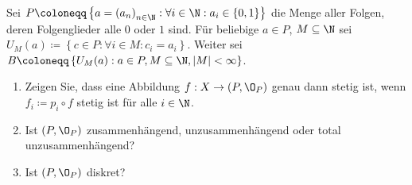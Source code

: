 \newpage
\begin{assignment}
  Sei \( P \coloneqq \left \{ a = {(a_n)}_{n \in \N} : \forall i \in \N : a_i \in \left \{ 0,1 \right \} \right \} \) die Menge aller Folgen, deren Folgenglieder alle \( 0 \) oder \( 1 \) sind. Für beliebige \( a \in P \), \( M \subseteq \N \) sei \( U_M(a) \coloneqq \left \{ c \in P : \forall i \in M : c_i = a_i \right \} \). Weiter sei \( B \coloneqq \left \{ U_M(a) : a \in P, M \subseteq \N, \left\vert M \right\vert < \infty \right \} \).
  \begin{enumerate}[label=(\alph*)]
    \item Zeigen Sie, dass eine Abbildung \( f: X \to (P, \O_P) \) genau dann stetig ist, wenn \( f_i \coloneqq p_i \circ f \) stetig ist für alle \( i \in \N \).
    \item Ist \( (P, \O_P) \) zusammenhängend, unzusammenhängend oder total unzusammenhängend?
    \item Ist \( (P, \O_P) \) diskret?
  \end{enumerate}
\end{assignment}
